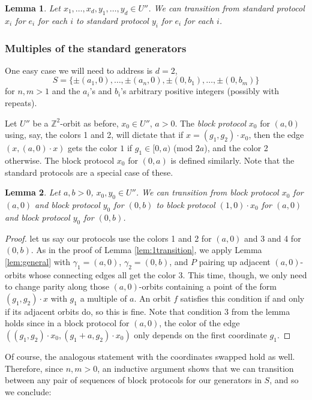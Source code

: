 \documentclass[10pt,a4paper]{article}
\newcommand{\0}{\varnothing}
\newcommand{\Z}{\mathbb{Z}}
\newtheorem{lemma}{Lemma}
\begin{document}
\begin{lemma}
Let $x_1,\ldots,x_d,y_1,\ldots,y_d \in U''$. We can transition from standard protocol $x_i$ for $e_i$ for each $i$ to standard protocol $y_i$ for $e_i$ for each $i$.
\end{lemma}

\subsubsection{Multiples of the standard generators}\label{subsubsec:block}

One easy case we will need to address is $d = 2$, $$S = \{\pm (a_1,0),\ldots,\pm (a_n,0), \pm(0,b_1),\ldots,\pm(0,b_m)\}$$ for $n,m > 1$ and the $a_i$'s and $b_i$'s arbitrary positive integers (possibly with repeats). 

Let $U''$ be a $\Z^2$-orbit as before, $x_0 \in U''$, $a > 0$. The \textit{block protocol} $x_0$ for $(a,0)$ using, say, the colors 1 and 2, will dictate that if $x = (g_1,g_2) \cdot x_0$, then the edge $(x,(a,0) \cdot x)$ gets the color $1$ if $g_1 \in [0,a)$ (mod $2a$), and the color 2 otherwise. The block protocol $x_0$ for $(0,a)$ is defined similarly. Note that the standard protocols are a special case of these.

\begin{lemma}\label{lem:blocktrans}
Let $a,b > 0$, $x_0,y_0 \in U''$. We can transition from block protocol $x_0$ for $(a,0)$ and block protocol $y_0$ for $(0,b)$ to block protocol $(1,0) \cdot x_0$ for $(a,0)$ and block protocol $y_0$ for $(0,b)$.
\end{lemma}
\begin{proof}
let us say our protocols use the colors 1 and 2 for $(a,0)$ and 3 and 4 for $(0,b)$. As in the proof of Lemma \ref{lem:1transition}, we apply Lemma \ref{lem:general} with $\gamma_1 = (a,0)$, $\gamma_2 = (0,b)$, and $P$ pairing up adjacent $(a,0)$-orbits whose connecting edges all get the color 3. This time, though, we only need to change parity along those $(a,0)$-orbits containing a point of the form $(g_1,g_2) \cdot x$ with $g_1$ a multiple of $a$. An orbit $f$ satisfies this condition if and only if its adjacent orbits do, so this is fine. Note that condition 3 from the lemma holds since in a block protocol for $(a,0)$, the color of the edge $((g_1,g_2) \cdot x_0, (g_1+a,g_2) \cdot x_0)$ only depends on the first coordinate $g_1$.
\end{proof}

Of course, the analogous statement with the coordinates swapped hold as well. Therefore, since $n,m > 0$, an inductive argument shows that we can transition between any pair of sequences of block protocols for our generators in $S$, and so we conclude:
\end{document}

